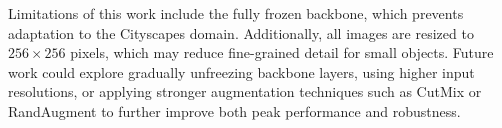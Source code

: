 \documentclass[conference]{IEEEtran}
\begin{document}
Limitations of this work include the fully frozen backbone, which prevents adaptation to the Cityscapes domain. Additionally, all images are resized to $256 \times 256$ pixels, which may reduce fine-grained detail for small objects. Future work could explore gradually unfreezing backbone layers, using higher input resolutions, or applying stronger augmentation techniques such as CutMix or RandAugment to further improve both peak performance and robustness.




\end{document}
